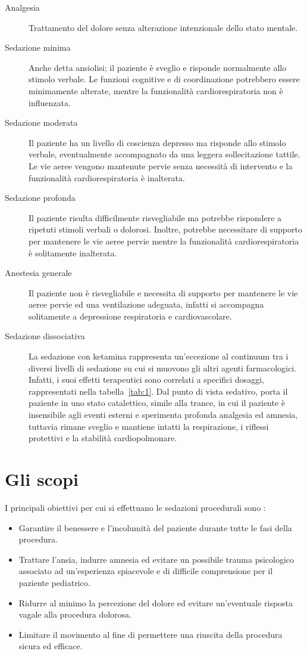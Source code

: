 \begin{description}
\item[Analgesia] Trattamento del dolore senza alterazione intenzionale dello stato mentale.
\item[Sedazione minima] Anche detta ansiolisi; il paziente è sveglio e risponde normalmente allo stimolo verbale. Le funzioni cognitive e di coordinazione potrebbero essere minimamente alterate, mentre la funzionalità cardiorespiratoria non è influenzata.
\item[Sedazione moderata] Il paziente ha un livello di coscienza depresso ma risponde allo stimolo verbale, eventualmente accompagnato da una leggera sollecitazione tattile. Le vie aeree vengono mantenute pervie senza necessità di intervento e la funzionalità cardiorespiratoria è inalterata. 
\item[Sedazione profonda] Il paziente risulta difficilmente risvegliabile ma potrebbe rispondere a ripetuti stimoli verbali o dolorosi. Inoltre, potrebbe necessitare di supporto per mantenere le vie aeree pervie mentre la funzionalità cardiorespiratoria è solitamente inalterata. 
\item[Anestesia generale] Il paziente non è risvegliabile e necessita di supporto per mantenere le vie aeree pervie ed una ventilazione adeguata, infatti si accompagna solitamente a depressione respiratoria e cardiovascolare. 
\item[Sedazione dissociativa] La sedazione con ketamina rappresenta un'eccezione al continuum tra i diversi livelli di sedazione su cui si muovono gli altri agenti farmacologici. Infatti, i suoi effetti terapeutici sono correlati a specifici dosaggi, rappresentati nella tabella~\ref{tab:1}. Dal punto di vista sedativo, porta il paziente in uno stato catalettico, simile alla trance, in cui il paziente è insensibile agli eventi esterni e sperimenta profonda analgesia ed amnesia, tuttavia rimane sveglio e mantiene intatti la respirazione, i riflessi protettivi e la stabilità cardiopolmonare.

\end{description}

\section{Gli scopi}

I principali obiettivi per cui si effettuano le sedazioni procedurali sono \cite{Uptodatesed}: 

\begin{itemize}
    \item Garantire il benessere e l'incolumità del paziente durante tutte le fasi della procedura.
    \item Trattare l'ansia, indurre amnesia ed evitare un possibile trauma psicologico associato ad un'esperienza spiacevole e di difficile comprensione per il paziente pediatrico.
    \item Ridurre al minimo la percezione del dolore ed evitare un'eventuale risposta vagale alla procedura dolorosa.
    \item Limitare il movimento al fine di permettere una riuscita della procedura sicura ed efficace.

\end{itemize}

